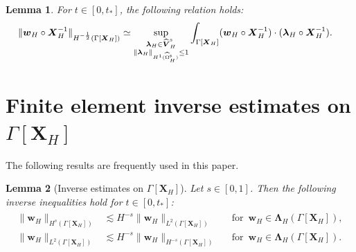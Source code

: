 \documentclass[11pt,reqno]{amsart}
\theoremstyle{definition}
\theoremstyle{plain}
\newtheorem{lemma}{Lemma}[section]
\numberwithin{theorem}{section}
\numberwithin{proposition}{section}
\numberwithin{lemma}{section}
\numberwithin{equation}{section}
\newcommand{\bs}[1]{\boldsymbol{#1}}
\renewcommand{\(}{\bigl(}
\renewcommand{\)}{\bigr)}
\begin{document}
\begin{lemma}\label{Lemma:H-half}
For $t\in[0,t_*]$, the following relation holds: 
\begin{align*}
\|{\bs w}_H\circ{\bs X}_H^{-1}\|_{H^{-\frac12}(\Gamma[{\bs X}_H])}
&\simeq 
\sup_{\substack{{\bs\lambda}_H\in \widehat{\bs V}^{\rm s}_H\\ \|{\bs\lambda}_H\|_{H^1(\widehat\Omega^{\rm s}_H)}\le 1}} \int_{\Gamma[{\bs X}_H]} ({\bs w}_H\circ{\bs X}_H^{-1}) \cdot ({\bs\lambda}_H\circ{\bs X}_H^{-1} ) .
\end{align*}
\end{lemma}


\section{Finite element inverse estimates on \texorpdfstring{$\Gamma[{\bs X}_H]$}{x}}
\label{appendix:inverse}

The following results are frequently used in this paper.

\begin{lemma}[Inverse estimates on {$\Gamma[{\bs X}_H]$}]\label{Lemma:inverse}
Let $s\in[0,1]$. Then the following inverse inequalities hold for $t\in[0,t_*]$: 
\begin{align}\label{wHL2-H-s}
\begin{aligned}
\|{\bs w}_H\|_{H^s(\Gamma[{\bs X}_H])}
&\lesssim H^{-s}\|{\bs w}_H\|_{L^2(\Gamma[{\bs X}_H])} 
&&\mbox{for}\,\,\, {\bs w}_H\in {\bs\Lambda}_H(\Gamma[{\bs X}_H]) ,\\
\|{\bs w}_H\|_{L^2(\Gamma[{\bs X}_H])}
&\lesssim H^{-s}\|{\bs w}_H\|_{H^{-s}(\Gamma[{\bs X}_H])} 
&&\mbox{for}\,\,\, {\bs w}_H\in {\bs\Lambda}_H(\Gamma[{\bs X}_H]) . 
\end{aligned}
\end{align}
\end{lemma}
\end{document}
